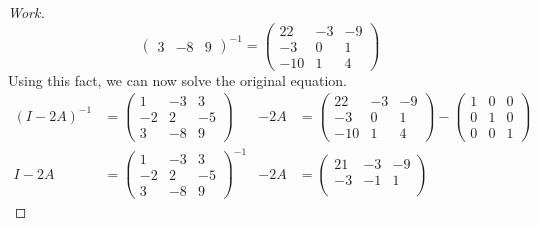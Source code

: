 \documentclass{article}
\begin{document}
\begin{proof}[Work]
\[\begin{pmatrix}
            3  & -8 & 9
        \end{pmatrix}^{-1} =
        \begin{pmatrix}
            22  & -3 & -9 \\
            -3  & 0  & 1  \\
            -10 & 1  & 4
        \end{pmatrix}
    \]
    Using this fact, we can now solve the original equation.
    \begin{align*}
        (I - 2A)^{-1} & = \begin{pmatrix}
                              1  & -3 & 3  \\
                              -2 & 2  & -5 \\
                              3  & -8 & 9
                          \end{pmatrix}  & -2A & =  \begin{pmatrix}
                                                        22  & -3 & -9 \\
                                                        -3  & 0  & 1  \\
                                                        -10 & 1  & 4
                                                    \end{pmatrix} - \begin{pmatrix}
                                                                        1 & 0 & 0 \\
                                                                        0 & 1 & 0 \\
                                                                        0 & 0 & 1
                                                                    \end{pmatrix}               \\
        I - 2A        & = \begin{pmatrix}
                              1  & -3 & 3  \\
                              -2 & 2  & -5 \\
                              3  & -8 & 9
                          \end{pmatrix}^{-1} & -2A & = \begin{pmatrix}
                                                           21  & -3 & -9 \\
                                                           -3  & -1 & 1  \\

\end{pmatrix}
\end{align*}
\end{proof}
\end{document}
